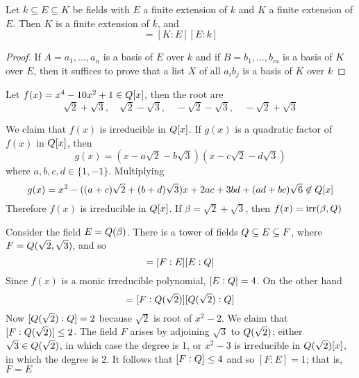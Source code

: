 \documentclass[11pt]{article}
\begin{document}
\begin{theorem}[]
Let \(k\subseteq E\subseteq K\) be fields with \(E\) a finite extension of \(k\)
and \(K\) a finite extension of \(E\). Then \(K\) is a finite extension of \(k\), and
\begin{equation*}
[K:k]=[K:E][E:k]
\end{equation*}
\end{theorem}

\begin{proof}
If \(A=a_1,\dots,a_n\) is a basis of \(E\) over \(k\) and if \(B=b_1,\dots,b_m\)
is a basis of \(K\) over \(E\), then it suffices to prove that a list \(X\) of all
\(a_ib_j\) is a basis of \(K\) over \(k\)
\end{proof}

\begin{examplle}[]
Let \(f(x)=x^4-10x^2+1\in\relax{Q}[x]\), then the root are
\begin{equation*}
\sqrt{2}+\sqrt{3},\quad 
\sqrt{2}-\sqrt{3},\quad 
-\sqrt{2}-\sqrt{3},\quad 
-\sqrt{2}+\sqrt{3}
\end{equation*}

We claim that \(f(x)\) is irreducible in \(\relax{Q}[x]\). If \(g(x)\) is a
quadratic factor of \(f(x)\) in \(\relax{Q}[x]\), then
\begin{equation*}
g(x)=(x-a\sqrt{2}-b\sqrt{3})(x-c\sqrt{2}-d\sqrt{3})
\end{equation*}
where \(a,b,c,d\in\{1,-1\}\). Multiplying
\begin{equation*}
g(x)=x^2-((a+c)\sqrt{2}+(b+d)\sqrt{3})x+2ac+3bd+(ad+bc)\sqrt{6}\not\in\relax{Q}[x]
\end{equation*}
Therefore \(f(x)\) is irreducible in \(\relax{Q}[x]\). If
\(\beta=\sqrt{2}+\sqrt{3}\), then \(f(x)=\operatorname{irr}(\beta,\relax{Q})\)

Consider the field \(E=\relax{Q}(\beta)\). There is a tower of fields 
\(\relax{Q}\subseteq E\subseteq F\), where \(F=\relax{Q}(\sqrt{2},\sqrt{3})\), and so 
\begin{equation*}
[F:\Q]=[F:E][E:\Q]
\end{equation*}
Since \(f(x)\) is a monic irreducible polynomial, \([E:\relax{Q}]=4\). On the other
hand
\begin{equation*}
[F:\Q]=[F:\Q(\sqrt{2})][\Q(\sqrt{2}):\Q]
\end{equation*}
Now \([\relax{Q}(\sqrt{2}):\relax{Q}]=2\) because \(\sqrt{2}\) is root of \(x^2-2\). We
claim that \([F:\relax{Q}(\sqrt{2})]\le2\). The field \(F\) arises by adjoining
\(\sqrt{3}\) to \(\relax{Q}(\sqrt{2})\); either \(\sqrt{3}\in\relax{Q}(\sqrt{2})\), in
which case the degree is 1, or \(x^2-3\) is irreducible in
\(\relax{Q}(\sqrt{2})[x]\), in which the degree is 2. It follows that \([F:\relax{Q}]\le4\)
and so \([F:E]=1\); that is, \(F=E\)
\end{examplle}
\end{document}
